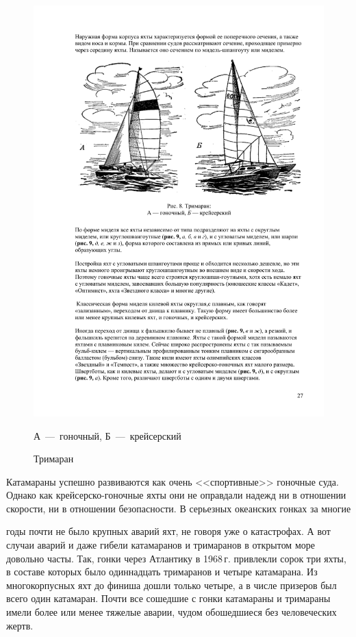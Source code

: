 \documentclass[a4paper, 12pt, twoside, final]{scrbook}
\begin{document}
\begin{figure}[htbp]
\centering\includegraphics[scale=0.9]{Trimaran}
\caption{\label{fig:8}Тримаран}
\begin{centering}\small
А~---~гоночный, Б~---~крейсерский\par
\end{centering}
\end{figure}


Катамараны успешно развиваются как очень <<спортивные>> гоночные суда.
Однако как крейсерско-гоночные яхты они не оправдали надежд ни в отношении
скорости, ни в отношении безопасности. В серьезных океанских гонках
за многие

годы почти не было крупных аварий яхт, не говоря уже о катастрофах.
А вот случаи аварий и даже гибели катамаранов и тримаранов в открытом
море довольно часты. Так, гонки через Атлантику в 1968\,г. привлекли
сорок три яхты, в составе которых было одиннадцать тримаранов и четыре
катамарана. Из многокорпусных яхт до финиша дошли только четыре, а
в числе призеров был всего один катамаран. Почти все сошедшие с гонки
катамараны и тримараны имели более или менее тяжелые аварии, чудом
обошедшиеся без человеческих жертв.
\end{document}
